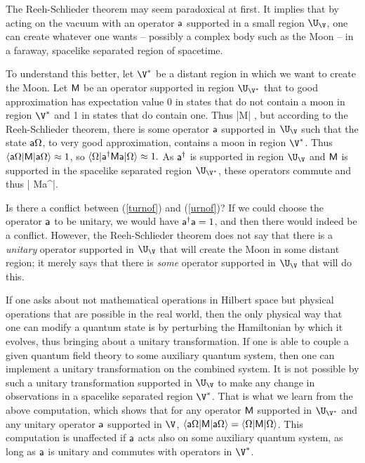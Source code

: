 \documentclass[12pt]{article}
\def\a{{\sf a}}
\numberwithin{equation}{section}
\begin{document}
\def\MM{{\sf M}}
The Reeh-Schlieder theorem may seem paradoxical at first.  It implies that by acting on the vacuum with an operator $\a$
supported in a small region $\U_\V$, one can create whatever one wants -- possibly a complex body such as the Moon --  in a faraway, spacelike separated region of spacetime.

To understand this better, let $\V^*$ be a distant region in which we want to create the Moon.  Let $\MM $ be an operator supported in region $\U_{\V^*}$ that to good approximation has expectation value 0 in states
that do not contain a moon in region $\V^*$ and 1 in states that do contain one.  Thus
\be\label{turnof}\langle \Omega|\MM |\Omega\rangle {} ,\ee
but according to the Reeh-Schlieder theorem, there is some operator $\a$ supported in $\U_\V$ such that the state $\a\Omega$,
to very good approximation, contains a moon in region $\V^*$.   Thus $\langle \a\Omega|\MM |\a\Omega\rangle\approx 1$, so
$\langle\Omega|\a^\dagger \MM  \a|\Omega\rangle\approx 1.$    As $\a^\dagger $ is supported in region $\U_\V$ and $\MM $ is supported in the
spacelike separated region $\U_{\V^*}$, these operators commute and thus
\be\label{urnof}\langle\Omega| \MM  \a^\dagger \a|\Omega\rangle {}. \ee

Is there a conflict between (\ref{turnof}) and (\ref{urnof})?   If we could choose the operator $\a$ to be unitary, we would have $\a^\dagger \a=1$,
and then there would indeed be a conflict.   However, the Reeh-Schlieder theorem does not say that there is a {\it unitary} operator
supported in $\U_\V$ that will create the Moon in some distant region; it merely says that there is {\it some} operator supported in 
$\U_\V$ that will do this.  

If one asks about not mathematical operations  in Hilbert space but physical operations that 
are possible in the real world, then the only physical way that one can modify a quantum state is by perturbing the Hamiltonian by which it
evolves, thus bringing about a unitary transformation.  If one is able to couple a given quantum field theory to some auxiliary quantum system,
then one can implement a unitary transformation on the combined system.  It is not possible by such a unitary transformation supported
in $\U_\V$ to make any change in observations in a spacelike separated region $\V^*$.  That is what we learn from the above computation,
which shows that for any operator $\MM $ supported in $\U_{\V^*}$ and any unitary operator $\a$ supported in $\V$,
$\langle \a\Omega|\MM |\a\Omega\rangle =\langle \Omega|\MM |\Omega\rangle$.  
This computation is unaffected if $\a$ acts also on some auxiliary quantum system, as long as $\a$ is unitary and commutes with operators
in $\V^*$.
\end{document}
